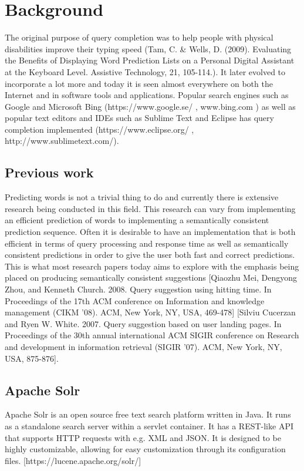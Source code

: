 \section{Background}\label{background}

The original purpose of query completion was to help people with physical disabilities improve their typing speed (Tam, C. \& Wells, D. (2009). Evaluating the Benefits of Displaying Word Prediction Lists on a Personal Digital Assistant at the Keyboard Level. Assistive Technology, 21, 105-114.). It later evolved to incorporate a lot more and today it is seen almost everywhere on both the Internet and in software tools and applications. Popular search engines such as Google and Microsoft Bing (https://www.google.se/ , www.bing.com ) as well as popular text editors and IDEs such as Sublime Text and Eclipse has query completion implemented (https://www.eclipse.org/ , http://www.sublimetext.com/).

\subsection{Previous work}\label{previouswork}

Predicting words is not a trivial thing to do and currently there is extensive research being conducted in this field. This research can vary from implementing an efficient prediction of words to implementing a semantically consistent prediction sequence. Often it is desirable to have an implementation that is both efficient in terms of query processing and response time as well as semantically consistent predictions in order to give the user both fast and correct predictions. This is what most research papers today aims to explore with the emphasis being placed on producing semantically consistent suggestions [Qiaozhu Mei, Dengyong Zhou, and Kenneth Church. 2008. Query suggestion using hitting time. In Proceedings of the 17th ACM conference on Information and knowledge management (CIKM '08). ACM, New York, NY, USA, 469-478] 
[Silviu Cucerzan and Ryen W. White. 2007. Query suggestion based on user landing pages. In Proceedings of the 30th annual international ACM SIGIR conference on Research and development in information retrieval (SIGIR '07). ACM, New York, NY, USA, 875-876]. 

\subsection{Apache Solr}

Apache Solr is an open source free text search platform written in Java. It runs as a standalone search server within a servlet container. It has a REST-like API that supports HTTP requests with e.g. XML and JSON. It is designed to be highly customizable, allowing for easy customization through its configuration files.
[https://lucene.apache.org/solr/]

